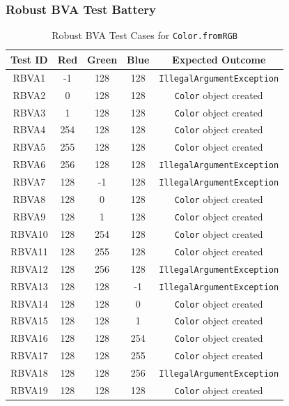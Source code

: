 \documentclass[11pt, a4paper]{article}
\begin{document}
\subsubsection{Robust BVA Test Battery}
\begin{table}[H]
\centering
\caption{Robust BVA Test Cases for \texttt{Color.fromRGB}}
\label{tab:color_robust_bva}
\begin{tabular}{ccccc}
\toprule
\textbf{Test ID} & \textbf{Red} & \textbf{Green} & \textbf{Blue} & \textbf{Expected Outcome} \\
\midrule
RBVA1  & -1  & 128 & 128 & \texttt{IllegalArgumentException} \\
RBVA2  & 0   & 128 & 128 & \texttt{Color} object created \\
RBVA3  & 1   & 128 & 128 & \texttt{Color} object created \\
RBVA4  & 254 & 128 & 128 & \texttt{Color} object created \\
RBVA5  & 255 & 128 & 128 & \texttt{Color} object created \\
RBVA6  & 256 & 128 & 128 & \texttt{IllegalArgumentException} \\
RBVA7  & 128 & -1  & 128 & \texttt{IllegalArgumentException} \\
RBVA8  & 128 & 0   & 128 & \texttt{Color} object created \\
RBVA9  & 128 & 1   & 128 & \texttt{Color} object created \\
RBVA10 & 128 & 254 & 128 & \texttt{Color} object created \\
RBVA11 & 128 & 255 & 128 & \texttt{Color} object created \\
RBVA12 & 128 & 256 & 128 & \texttt{IllegalArgumentException} \\
RBVA13 & 128 & 128 & -1  & \texttt{IllegalArgumentException} \\
RBVA14 & 128 & 128 & 0   & \texttt{Color} object created \\
RBVA15 & 128 & 128 & 1   & \texttt{Color} object created \\
RBVA16 & 128 & 128 & 254 & \texttt{Color} object created \\
RBVA17 & 128 & 128 & 255 & \texttt{Color} object created \\
RBVA18 & 128 & 128 & 256 & \texttt{IllegalArgumentException} \\
RBVA19 & 128 & 128 & 128 & \texttt{Color} object created \\
\bottomrule
\end{tabular}
\end{table}
\end{document}
